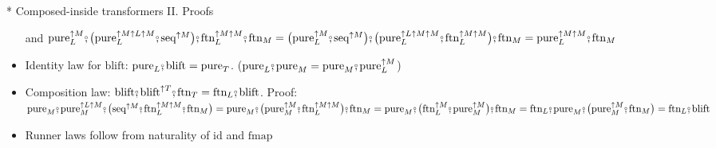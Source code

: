 \documentclass[english]{beamer}
\newcommand{\bef}{\ensuremath\raisebox{2pt}{$\mathsmaller{\mathsmaller{\circ}}$}\hspace{-3.3pt},}
\begin{document}
\begin{frame}{{*} Composed-inside transformers II. Proofs}
\begin{itemize}
{and $\text{pure}_{L}^{\uparrow M}\bef\big(\text{pure}_{L}^{\uparrow M\uparrow L\uparrow M}\bef\text{seq}^{\uparrow M}\big)\bef\text{ftn}_{L}^{\uparrow M\uparrow M}\bef\text{ftn}_{M}=\big(\text{pure}_{L}^{\uparrow M}\bef\text{seq}^{\uparrow M}\big)\bef\big(\text{pure}_{L}^{\uparrow L\uparrow M\uparrow M}\bef\text{ftn}_{L}^{\uparrow M\uparrow M}\big)\bef\text{ftn}_{M}=\text{pure}_{L}^{\uparrow M\uparrow M}\bef\text{ftn}_{M}$}{\footnotesize\par}
\item Identity law for $\text{blift}$: $\text{pure}_{L}\bef\text{blift}=\text{pure}_{T}$.{\footnotesize{}
($\text{pure}_{L}\bef\text{pure}_{M}=\text{pure}_{M}\bef\text{pure}_{L}^{\uparrow M}$)}{\footnotesize\par}
\item Composition law: $\text{blift}\bef\text{blift}^{\uparrow T}\bef\text{ftn}_{T}=\text{ftn}_{L}\bef\text{blift}$.
{\footnotesize{}Proof: $\text{pure}_{M}\bef\text{pure}_{M}^{\uparrow L\uparrow M}\bef\big(\text{seq}^{\uparrow M}\bef\text{ftn}_{L}^{\uparrow M\uparrow M}\bef\text{ftn}_{M}\big)=\text{pure}_{M}\bef\big(\text{pure}_{M}^{\uparrow M}\bef\text{ftn}_{L}^{\uparrow M\uparrow M}\big)\bef\text{ftn}_{M}=\text{pure}_{M}\bef\big(\text{ftn}_{L}^{\uparrow M}\bef\text{pure}_{M}^{\uparrow M}\big)\bef\text{ftn}_{M}=\text{ftn}_{L}\bef\text{pure}_{M}\bef\big(\text{pure}_{M}^{\uparrow M}\bef\text{ftn}_{M}\big)=\text{ftn}_{L}\bef\text{blift}$}{\footnotesize\par}
\item Runner laws follow from naturality of $\text{id}$ and $\text{fmap}$ 
\end{itemize}
\end{frame}
\end{document}
